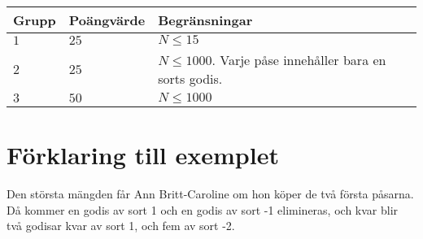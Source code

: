 \begin{tabular}{| l | l | l |}
	\hline
	Grupp & Poängvärde & Begränsningar\\ \hline
 $1$    & $25$        & $N \le 15$ \\ \hline
 $2$    & $25$        & $N \le 1000$. Varje påse innehåller bara en sorts godis. \\ \hline
 $3$    & $50$        & $N \le 1000$ \\ \hline
\end{tabular}

\section*{Förklaring till exemplet}
Den största mängden får Ann Britt-Caroline om hon köper de två första påsarna. Då kommer en godis av sort 1 och en godis av sort -1 elimineras, och kvar blir två godisar kvar av sort 1, och fem av sort -2.
